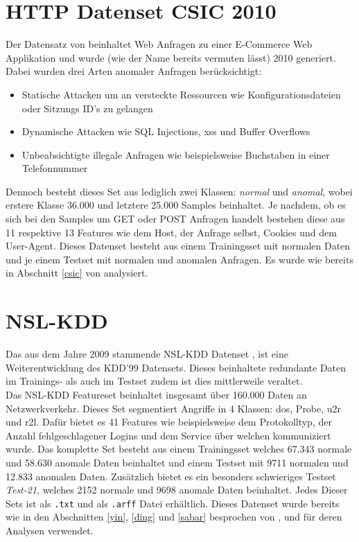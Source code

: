 \documentclass[
    12pt, %
    DIV10,
    ngerman, %
    a4paper, %
    oneside, %
    titlepage, %
    parskip=half, %
    headings=normal, %
    listof=totoc, %
    bibliography=totoc, %
    index=totoc, %
    captions=tableheading, %
    final %
]{scrreprt}
\begin{document}
\section{HTTP Datenset CSIC 2010}
Der Datensatz von \textcite{csic} beinhaltet Web Anfragen zu einer E-Commerce Web Applikation und wurde (wie der Name bereits vermuten lässt) 2010 generiert. Dabei wurden drei Arten anomaler Anfragen berücksichtigt:
\begin{itemize}
\item Statische Attacken um an versteckte Ressourcen wie Konfigurationsdateien oder Sitzungs ID's zu gelangen
\item Dynamische Attacken wie SQL Injections, \ac{xss} und Buffer Overflows
\item Unbeabsichtigte illegale Anfragen wie beispielsweise Buchstaben in einer Telefonnummer 
\end{itemize}
Dennoch besteht dieses Set aus lediglich zwei Klassen: \emph{normal} und \emph{anomal}, wobei erstere Klasse 36.000 und letztere 25.000 Samples beinhaltet.
Je nachdem, ob es sich bei den Samples um GET oder POST Anfragen handelt bestehen diese aus 11 respektive 13 Features wie dem Host, der Anfrage selbst, Cookies und dem User-Agent. Dieses Datenset besteht aus einem Trainingsset mit normalen Daten und je einem Testset mit normalen und anomalen Anfragen. Es wurde wie bereits in Abschnitt \ref{csic} von \textcite{Pham2016} analysiert.
\section{NSL-KDD}
Das aus dem Jahre 2009 stammende NSL-KDD Datenset \parencite{Cybersecurity}, ist eine Weiterentwicklung des KDD'99 Datensets. Dieses beinhaltete redundante Daten im Trainings- als auch im Testset zudem ist dies mittlerweile veraltet.\\
Das NSL-KDD Featureset beinhaltet insgesamt über 160.000 Daten an Netzwerkverkehr. Dieses Set segmentiert Angriffe in 4 Klassen: \ac{dos}, Probe, \ac{u2r} und \ac{r2l}. Dafür bietet es 41 Features wie beispielsweise dem Protokolltyp, der Anzahl fehlgeschlagener Logins und dem Service über welchen kommuniziert wurde. Das komplette Set besteht aus einem Trainingsset welches 67.343 normale und 58.630 anomale Daten beinhaltet und einem Testset mit 9711 normalen und 12.833 anomalen Daten. Zusätzlich bietet es ein besonders schwieriges Testset \emph{Test-21}, welches 2152 normale und 9698 anomale Daten beinhaltet. Jedes Dieser Sets ist als \texttt{.txt} und als \texttt{.arff} Datei erhältlich.
Dieses Datenset wurde bereits wie in den Abschnitten \ref{yin}, \ref{ding} und \ref{sabar} besprochen von \textcite{Yin2017}, \textcite{Ding2018} und \textcite{Sabar2018} für deren Analysen verwendet.
\end{document}
